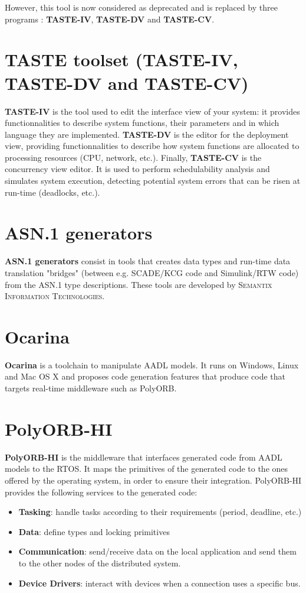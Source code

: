 \documentclass[11pt]{book}
\newcommand{\Concept}[1]{#1\xspace}
\newcommand{\aadl}{\Concept{AADL}}
\begin{document}
   However, this tool is now considered as deprecated and is replaced by three
   programs : \textbf{TASTE-IV}, \textbf{TASTE-DV} and \textbf{TASTE-CV}.

   \section{TASTE toolset (TASTE-IV, TASTE-DV and TASTE-CV)}
   \label{section-taste-toolsuite}
   \textbf{TASTE-IV} is the tool used to edit the interface view of your system:
   it provides functionnalities to describe system functions, their
   parameters and in which language they are implemented. \textbf{TASTE-DV} is
   the editor for the deployment view, providing functionnalities to describe
   how system functions are allocated to processing resources (CPU, network,
   etc.). Finally, \textbf{TASTE-CV} is the concurrency view editor. It is used
   to perform schedulability analysis and simulates system execution, detecting
   potential system errors that can be risen at run-time (deadlocks, etc.).


   \section{ASN.1 generators}
   \textbf{ASN.1 generators} consist in tools that creates data types and run-time data translation
   "bridges" (between e.g. SCADE/KCG code and Simulink/RTW code) from the ASN.1 type descriptions. 
   These tools are developed by \textsc{Semantix Information Technologies}.

   \section{Ocarina}
   \textbf{Ocarina} is a toolchain to manipulate \aadl models. It runs on Windows, Linux
   and Mac OS X and proposes code generation features that produce code that
   targets real-time middleware such as PolyORB.

   \section{PolyORB-HI}
   \textbf{PolyORB-HI} is the middleware that interfaces generated code from \aadl models
   to the RTOS. It maps the primitives of the generated code to the ones offered by the
   operating system, in order to ensure their integration. PolyORB-HI provides
   the following services to the generated code:
   \begin{itemize}
      \item
         \textbf{Tasking}: handle tasks according to their requirements (period,
         deadline, etc.)
      \item
         \textbf{Data}: define types and locking primitives
      \item
         \textbf{Communication}: send/receive data on the local application and
         send them to the other nodes of the distributed system.
      \item
         \textbf{Device Drivers}: interact with devices when a connection uses a
         specific bus.
   \end{itemize}
\end{document}
